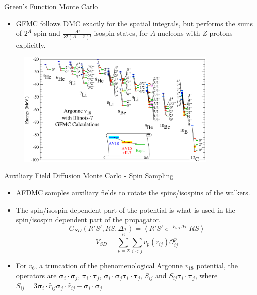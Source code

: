 \documentclass{beamer}
\newcommand{\ket}[1]{\left| #1 \right>}
\newcommand{\bra}[1]{\left< #1 \right|}
\newcommand{\Opij}{\mathcal{O}_{ij}^p}
\newcommand{\dt}{\Delta\tau}
\newcommand{\ti}{\bm{\tau}_i}
\newcommand{\tj}{\bm{\tau}_j}
\newcommand{\si}{\bm{\sigma}_i}
\newcommand{\sj}{\bm{\sigma}_j}
\begin{document}
\begin{frame}{Green's Function Monte Carlo}
\begin{itemize}
   \item GFMC follows DMC exactly for the spatial integrals, but performs the sums of $2^A$ spin and $\frac{A!}{Z!(A-Z)!}$ isospin states, for $A$ nucleons with $Z$ protons explicitly.
\end{itemize}
\begin{figure}
   \includegraphics[width=0.85\textwidth]{../figures/gfmc_energies.png}
\end{figure}
\end{frame}

\begin{frame}{Auxiliary Field Diffusion Monte Carlo - Spin Sampling}
\begin{itemize}
   \item AFDMC samples auxiliary fields to rotate the spins/isospins of the walkers.
   \item The spin/isospin dependent part of the potential is what is used in the spin/isospin dependent part of the propagator.
   \begin{equation*}
      G_{SD}(R'S',RS,\dt) = \bra {R'S'}e^{-V_{SD}\dt} \ket{RS}
   \end{equation*}
   \begin{equation*}
      V_{SD} = \sum\limits_{p=2}^6\sum\limits_{i<j}v_p(r_{ij})\Opij
   \end{equation*}
   \item For $v_6$, a truncation of the phenomenological Argonne $v_{18}$ potential, the operators are $\si\cdot\sj$, $\ti\cdot\tj$, $\si\cdot\sj \ti\cdot\tj$, $S_{ij}$ and $S_{ij} \ti\cdot\tj$, where $S_{ij} = 3\si\cdot\hat{r}_{ij}\sj\cdot\hat{r}_{ij}-\si\cdot\sj$
\end{itemize}
\end{frame}
\end{document}
